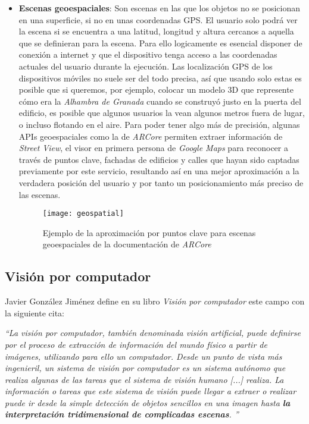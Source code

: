 \begin{itemize}
    \item \textbf{Escenas geoespaciales}: Son escenas en las que los objetos no se posicionan en una superficie, si no en unas coordenadas GPS. El usuario solo podrá ver la escena si se encuentra a una latitud, longitud y altura cercanos a aquella que se definieran para la escena. Para ello logicamente es esencial disponer de conexión a internet y que el dispositivo tenga acceso a las coordenadas actuales del usuario durante la ejecución. Las localización GPS de los dispositivos móviles no suele ser del todo precisa, así que usando solo estas es posible que si queremos, por ejemplo, colocar un modelo 3D que represente cómo era la \textit{Alhambra de Granada} cuando se construyó justo en la puerta del edificio, es posible que algunos usuarios la vean algunos metros fuera de lugar, o incluso flotando en el aire. Para poder tener algo más de precisión, algunas APIs geoespaciales como la de \textit{ARCore}\cite{arcore} permiten  extraer información de \textit{Street View}, el visor en primera persona de \textit{Google Maps} para reconocer a través de puntos clave, fachadas de edificios y calles que hayan sido captadas previamente por este servicio, resultando así en una mejor aproximación a la verdadera posición del usuario y por tanto un posicionamiento más preciso de las escenas.

    \begin{figure}[h]
        \centering
        \texttt{[image: geospatial]}
        \caption[Ejemplo ground]{Ejemplo de la aproximación por puntos clave para escenas geoespaciales de la documentación de \textit{ARCore}\cite{arcore}}
    \end{figure}

\end{itemize}


\subsection{Visión por computador}
Javier González Jiménez define en su libro \textit{Visión por computador}\cite{visioncomputador} este campo con la siguiente cita:


    \textit{``La visión por computador, también denominada visión artificial, puede definirse por el proceso de extracción de información del mundo físico a partir de imágenes, utilizando para ello un computador. Desde un punto de vista más ingenieril, un sistema de visión por computador es un sistema autónomo que realiza algunas de las tareas que el sistema de visión humano [...] realiza. La información o tareas que este sistema de visión puede llegar a extraer o realizar puede ir desde la simple detección de objetos sencillos en una imagen hasta \textbf{la interpretación tridimensional de complicadas escenas}.
    ''}

